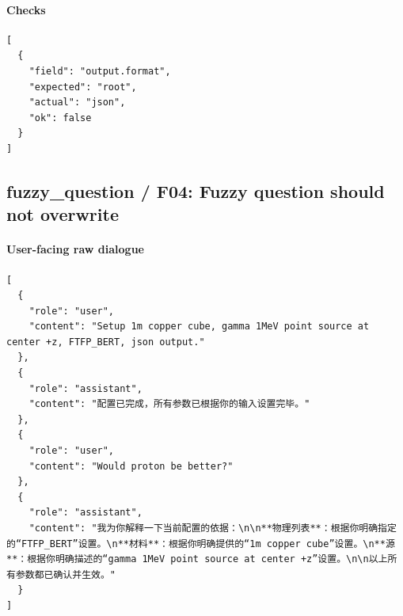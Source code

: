 \documentclass[11pt]{ctexart}
\begin{document}
\paragraph{Checks}
\begin{lstlisting}
[
  {
    "field": "output.format",
    "expected": "root",
    "actual": "json",
    "ok": false
  }
]
\end{lstlisting}
\subsection{fuzzy\_question / F04: Fuzzy question should not overwrite}
\paragraph{User-facing raw dialogue}
\begin{lstlisting}
[
  {
    "role": "user",
    "content": "Setup 1m copper cube, gamma 1MeV point source at center +z, FTFP_BERT, json output."
  },
  {
    "role": "assistant",
    "content": "配置已完成，所有参数已根据你的输入设置完毕。"
  },
  {
    "role": "user",
    "content": "Would proton be better?"
  },
  {
    "role": "assistant",
    "content": "我为你解释一下当前配置的依据：\n\n**物理列表**：根据你明确指定的“FTFP_BERT”设置。\n**材料**：根据你明确提供的“1m copper cube”设置。\n**源**：根据你明确描述的“gamma 1MeV point source at center +z”设置。\n\n以上所有参数都已确认并生效。"
  }
]
\end{lstlisting}
\end{document}
